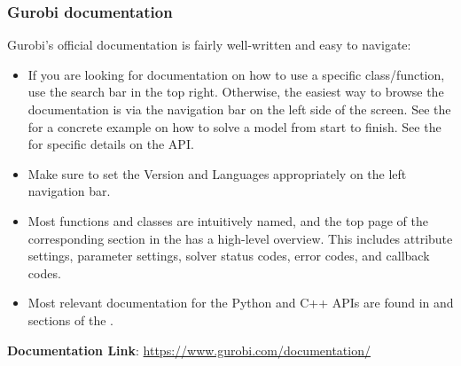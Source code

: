 \documentclass[12pt]{article}
\begin{document}
\subsubsection{Gurobi documentation}
Gurobi's official documentation is fairly well-written and easy to navigate:
\begin{itemize}
    \item If you are looking for documentation on how to use a specific class/function, use the search bar in the top right. Otherwise, the easiest way to browse the documentation is via the navigation bar on the left side of the screen. See the  for a concrete example on how to solve a model from start to finish. See the  for specific details on the API.
    \item Make sure to set the Version and Languages appropriately on the left navigation bar.
    \item Most functions and classes are intuitively named, and the top page of the corresponding section in the  has a high-level overview. This includes attribute settings, parameter settings, solver status codes, error codes, and callback codes.
    \item Most relevant documentation for the Python and C++ APIs are found in  and  sections of the .
\end{itemize}
\textbf{Documentation Link}: \url{https://www.gurobi.com/documentation/}
\end{document}
